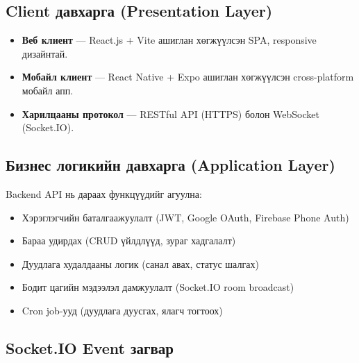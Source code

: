 \documentclass[12pt, a4paper]{report}
\begin{document}
\subsection{Client давхарга (Presentation Layer)}

\begin{itemize}
  \item \textbf{Веб клиент} — React.js + Vite ашиглан хөгжүүлсэн SPA, responsive дизайнтай.
  \item \textbf{Мобайл клиент} — React Native + Expo ашиглан хөгжүүлсэн cross-platform мобайл апп.
  \item \textbf{Харилцааны протокол} — RESTful API (HTTPS) болон WebSocket (Socket.IO).
\end{itemize}

\subsection{Бизнес логикийн давхарга (Application Layer)}

Backend API нь дараах функцүүдийг агуулна:
\begin{itemize}
  \item Хэрэглэгчийн баталгаажуулалт (JWT, Google OAuth, Firebase Phone Auth)
  \item Бараа удирдах (CRUD үйлдлүүд, зураг хадгалалт)
  \item Дуудлага худалдааны логик (санал авах, статус шалгах)
  \item Бодит цагийн мэдээлэл дамжуулалт (Socket.IO room broadcast)
  \item Cron job-ууд (дуудлага дуусгах, ялагч тогтоох)
\end{itemize}

\subsection{Socket.IO Event загвар}
\end{document}
